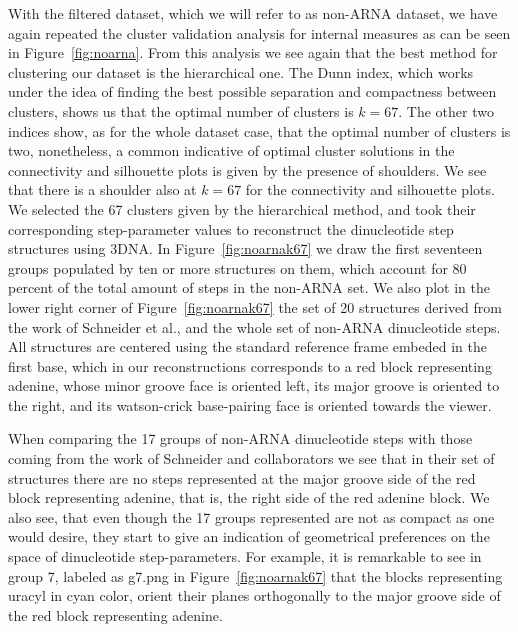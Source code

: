 With the filtered dataset, which we will refer to as non-ARNA dataset,
we have  again repeated the  cluster validation analysis  for internal
measures as can be seen in Figure~\ref{fig:noarna}. From this analysis
we see  again that the best  method for clustering our  dataset is the
hierarchical  one. The  Dunn  index,  which works  under  the idea  of
finding the best possible separation and compactness between clusters,
shows us that the optimal number  of clusters is $k=67$. The other two
indices show, as  for the whole dataset case,  that the optimal number
of  clusters  is two,  nonetheless,  a  common  indicative of  optimal
cluster solutions in the connectivity and silhouette plots is given by
the presence  of shoulders.  We see  that there is a  shoulder also at
$k=67$ for the  connectivity and silhouette plots. We  selected the 67
clusters   given  by   the   hierarchical  method,   and  took   their
corresponding  step-parameter values  to reconstruct  the dinucleotide
step structures using 3DNA.  In Figure~\ref{fig:noarnak67} we draw the
first seventeen  groups populated by  ten or more structures  on them,
which  account for  80 percent  of the  total amount  of steps  in the
non-ARNA  set.    We  also   plot  in  the   lower  right   corner  of
Figure~\ref{fig:noarnak67} the  set of 20 structures  derived from the
work  of Schneider et  al.\cite{schneider2004}, and  the whole  set of
non-ARNA  dinucleotide steps.  All structures  are centered  using the
standard  reference frame  embeded in  the  first base,  which in  our
reconstructions corresponds to a red block representing adenine, whose
minor groove  face is oriented left,  its major groove  is oriented to
the right, and its  watson-crick base-pairing face is oriented towards
the viewer.

When comparing the 17 groups of non-ARNA dinucleotide steps with those
coming from  the work  of Schneider and  collaborators we see  that in
their set  of structures there are  no steps represented  at the major
groove side of the red  block representing adenine, that is, the right
side of  the red adenine block. We  also see, that even  though the 17
groups represented are not as  compact as one would desire, they start
to  give an  indication of  geometrical  preferences on  the space  of
dinucleotide step-parameters.  For example, it is remarkable to see in
group  7, labeled  as  g7.png in  Figure~\ref{fig:noarnak67} that  the
blocks  representing  uracyl  in   cyan  color,  orient  their  planes
orthogonally to  the major groove  side of the red  block representing
adenine.

